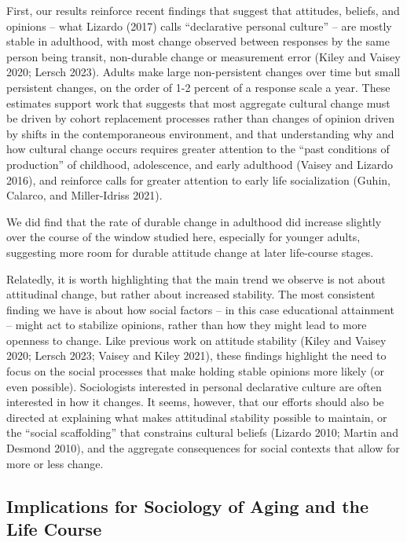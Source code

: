 \documentclass[
  12pt,
]{article}
\begin{document}
First, our results reinforce recent findings that suggest that attitudes, beliefs, and opinions -- what Lizardo (2017) calls ``declarative personal culture'' -- are mostly stable in adulthood, with most change observed between responses by the same person being transit, non-durable change or measurement error (Kiley and Vaisey 2020; Lersch 2023). Adults make large non-persistent changes over time but small persistent changes, on the order of 1-2 percent of a response scale a year. These estimates support work that suggests that most aggregate cultural change must be driven by cohort replacement processes rather than changes of opinion driven by shifts in the contemporaneous environment, and that understanding why and how cultural change occurs requires greater attention to the ``past conditions of production'' of childhood, adolescence, and early adulthood (Vaisey and Lizardo 2016), and reinforce calls for greater attention to early life socialization (Guhin, Calarco, and Miller-Idriss 2021).

We did find that the rate of durable change in adulthood did increase slightly over the course of the window studied here, especially for younger adults, suggesting more room for durable attitude change at later life-course stages.

Relatedly, it is worth highlighting that the main trend we observe is not about attitudinal change, but rather about increased stability. The most consistent finding we have is about how social factors -- in this case educational attainment -- might act to stabilize opinions, rather than how they might lead to more openness to change. Like previous work on attitude stability (Kiley and Vaisey 2020; Lersch 2023; Vaisey and Kiley 2021), these findings highlight the need to focus on the social processes that make holding stable opinions more likely (or even possible). Sociologists interested in personal declarative culture are often interested in how it changes. It seems, however, that our efforts should also be directed at explaining what makes attitudinal stability possible to maintain, or the ``social scaffolding'' that constrains cultural beliefs (Lizardo 2010; Martin and Desmond 2010), and the aggregate consequences for social contexts that allow for more or less change.

\hypertarget{implications-for-sociology-of-aging-and-the-life-course}{%
\subsection{Implications for Sociology of Aging and the Life Course}\label{implications-for-sociology-of-aging-and-the-life-course}}
\end{document}
